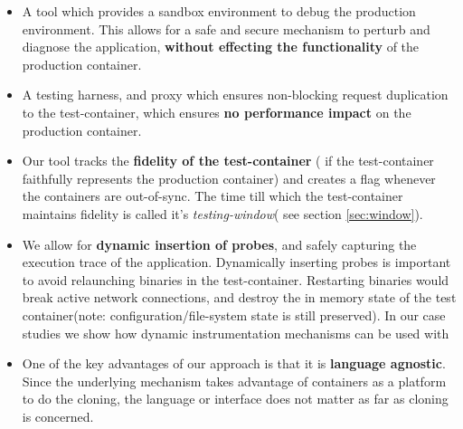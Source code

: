 \begin{itemize}

\item A tool which provides a sandbox environment to debug the production environment. 
This allows for a safe and secure mechanism to perturb and diagnose the application, \textbf{without effecting the functionality} of the  production container.

\item A testing harness, and proxy which ensures non-blocking request duplication to the test-container, which ensures \textbf{no performance impact} on the production container. 

\item Our tool tracks the \textbf{fidelity of the test-container} ( if the test-container faithfully represents the production container) and creates a flag whenever the containers are out-of-sync. 
The time till which the test-container maintains fidelity is called it's \emph{testing-window}( see section \ref{sec:window}).

\item We allow for \textbf{dynamic insertion of probes}, and safely capturing the execution trace of the application. 
Dynamically inserting probes is important to avoid relaunching binaries in the test-container. 
Restarting binaries would break active network connections, and destroy the in memory state of the test container(note: configuration/file-system state is still preserved).
In our case studies we show how dynamic instrumentation mechanisms can be used with \parikshan

\item One of the key advantages of our approach is that it is \textbf{language agnostic}. 
Since the underlying mechanism takes advantage of containers as a platform to do the cloning, the language or interface does not matter as far as cloning is concerned. 

\end{itemize}




